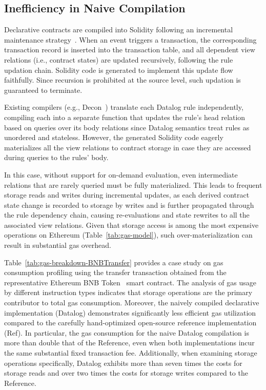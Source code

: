 \subsection{Inefficiency in Naive Compilation}
\label{ssec-inefficiency}

Declarative contracts are compiled into Solidity following an incremental
maintenance strategy~\cite{chen2022declarative}. 
When an event triggers a transaction, the corresponding transaction
record is inserted into the transaction table, and all dependent view relations
(i.e., contract states) are updated recursively, following the rule updation chain. Solidity code is generated to implement this update flow faithfully.
Since recursion is prohibited at the source level, such updation is guaranteed to terminate.
 
Existing compilers (e.g., Decon~\cite{chen2022declarative}) translate each Datalog rule independently, compiling each into a
separate function that updates the rule’s head relation based on queries over its
body relations since Datalog semantics treat rules as unordered and stateless. However, the generated Solidity code eagerly materializes all the view relations
to contract storage in case they are accessed during queries to the rules' body.

In this case, without support for on-demand evaluation, even intermediate relations that are rarely queried must be fully materialized. This leads to frequent storage reads and writes during incremental updates, as each derived contract state change is recorded to storage by writes and is further propagated through the rule dependency chain, causing re-evaluations and state rewrites to all the associated view relations. Given that storage access is among the most expensive operations on Ethereum (Table~\ref{tab:gas-model}), such over-materialization can result in substantial gas overhead.

Table~\ref{tab:gas-breakdown-BNBTransfer} provides a case study on gas consumption profiling using the transfer transaction obtained from the representative Ethereum {\sf BNB} Token~\cite{bnb} smart contract. The analysis of gas usage by different instruction types indicates that storage operations are the primary contributor to total gas consumption. Moreover, the naively compiled declarative implementation ({\sf Datalog}) demonstrates significantly less efficient gas utilization compared to the carefully hand-optimized open-source reference implementation ({\sf Ref}). In particular, the gas consumption for the naive Datalog compilation is more than double that of the Reference, even when both implementations incur the same substantial fixed transaction fee. Additionally, when examining storage operations specifically, Datalog exhibits more than seven times the costs for storage reads and over two times the costs for storage writes compared to the Reference.

